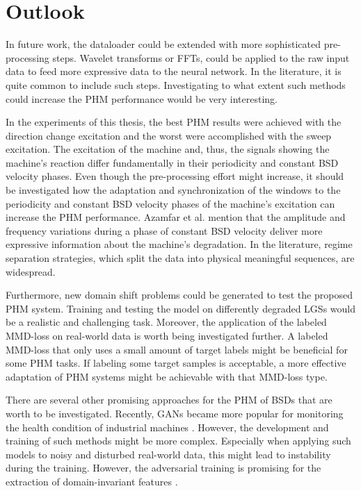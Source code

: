 \chapter{Outlook}
In future work, the dataloader could be extended with more sophisticated pre-processing steps. Wavelet transforms or FFTs, could be applied to the raw input data to feed more expressive data to the neural network. In the literature, it is quite common to include such steps. Investigating to what extent such methods could increase the PHM performance would be very interesting.

In the experiments of this thesis, the best PHM results were achieved with the direction change excitation and the worst were accomplished with the sweep excitation. The excitation of the machine and, thus, the signals showing the machine’s reaction differ fundamentally in their periodicity and constant BSD velocity phases. Even though the pre-processing effort might increase, it should be investigated how the adaptation and synchronization of the windows to the periodicity and constant BSD velocity phases of the machine's excitation can increase the PHM performance. Azamfar et al. \cite{AZAMFAR2020103932} mention that the amplitude and frequency variations during a phase of constant BSD velocity deliver more expressive information about the machine's degradation. In the literature, regime separation strategies, which split the data into physical meaningful sequences, are widespread.

Furthermore, new domain shift problems could be generated to test the proposed PHM system. Training and testing the model on differently degraded LGSs would be a realistic and challenging task.
Moreover, the application of the labeled MMD-loss on real-world data is worth being investigated further. A labeled MMD-loss that only uses a small amount of target labels might be beneficial for some PHM tasks.  If labeling some target samples is acceptable, a more effective adaptation of PHM systems might be achievable with that MMD-loss type.

There are several other promising approaches for the PHM of BSDs that are worth to be investigated. Recently, GANs became more popular for monitoring the health condition of industrial machines \cite{Zhang2019}. However, the development and training of such methods might be more complex. Especially when applying such models to noisy and disturbed real-world data, this might lead to instability during the training. However, the adversarial training is promising for the extraction of domain-invariant features \cite{Zhang2019}. 



